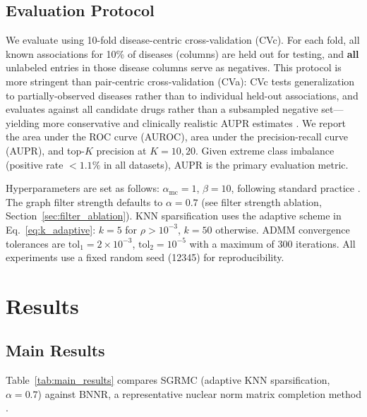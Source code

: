 \documentclass[webpdf,modern,large]{oup-authoring-template}
\begin{document}
\subsection{Evaluation Protocol}

We evaluate using 10-fold disease-centric cross-validation (CVc). For each fold, all known associations for 10\% of diseases (columns) are held out for testing, and \textbf{all} unlabeled entries in those disease columns serve as negatives. This protocol is more stringent than pair-centric cross-validation (CVa): CVc tests generalization to partially-observed diseases rather than to individual held-out associations, and evaluates against all candidate drugs rather than a subsampled negative set---yielding more conservative and clinically realistic AUPR estimates \cite{saito2015}. We report the area under the ROC curve (AUROC), area under the precision-recall curve (AUPR), and top-$K$ precision at $K=10, 20$. Given extreme class imbalance (positive rate $< 1.1\%$ in all datasets), AUPR is the primary evaluation metric.

Hyperparameters are set as follows: $\alpha_{\text{mc}} = 1$, $\beta = 10$, following standard practice \cite{yang2019}. The graph filter strength defaults to $\alpha = 0.7$ (see filter strength ablation, Section~\ref{sec:filter_ablation}). KNN sparsification uses the adaptive scheme in Eq.~\eqref{eq:k_adaptive}: $k=5$ for $\rho > 10^{-3}$, $k=50$ otherwise. ADMM convergence tolerances are $\text{tol}_1 = 2 \times 10^{-3}$, $\text{tol}_2 = 10^{-5}$ with a maximum of 300 iterations. All experiments use a fixed random seed (12345) for reproducibility.

\section{Results}
\label{sec:results}

\subsection{Main Results}

Table~\ref{tab:main_results} compares SGRMC (adaptive KNN sparsification, $\alpha = 0.7$) against BNNR, a representative nuclear norm matrix completion method \cite{yang2019}.
\end{document}
